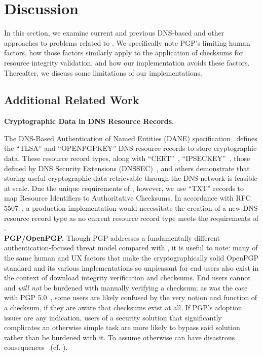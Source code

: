 \section{Discussion} \label{sec:discussion}

In this section, we examine current and previous DNS-based and other approaches
to problems related to \SYSTEM{}. We specifically note PGP's limiting human
factors, how those factors similarly apply to the application of checksums for
resource integrity validation, and how our \DNSSYS{} implementation avoids these
factors. Thereafter, we discuss some limitations of our implementations.

\subsection{Additional Related Work}

\noindent\textbf{Cryptographic Data in DNS Resource Records.}

The DNS-Based Authentication of Named Entities (DANE) specification~\cite{DANE1,
DANE2, DANE3} defines the ``TLSA'' and ``OPENPGPKEY'' DNS resource records to
store cryptographic data. These resource record types, along with
``CERT''~\cite{CERT}, ``IPSECKEY''~\cite{IPSECKEY}, those defined by DNS
Security Extensions (DNSSEC)~\cite{DNSSEC}, and others demonstrate that storing
useful cryptographic data retrievable through the DNS network is feasible at
scale. Due the unique requirements of \DNSSYS{}, however, we use ``TXT'' records
to map Resource Identifiers to Authoritative Checksums. In accordance with RFC
5507~\cite{RFC5507}, a production \DNSSYS{} implementation would necessitate the
creation of a new DNS resource record type as no current resource record type
meets the requirements of \DNSSYS{}. \\

\noindent\textbf{PGP/OpenPGP.} Though PGP addresses a fundamentally different
authentication-focused threat model compared with \SYSTEM{}, it is useful to
note: many of the same human and UX factors that make the cryptographically
solid OpenPGP standard and its various implementations so unpleasant for end
users also exist in the context of download integrity verification and
checksums. End users cannot and \textit{will not} be burdened with manually
verifying a checksum; as was the case with PGP 5.0~\cite{PGPBad}, some users are
likely confused by the very notion and function of a checksum, if they are aware
that checksums exist at all. If PGP's adoption issues are any indication, users
of a security solution that significantly complicates an otherwise simple task
are more likely to bypass said solution rather than be burdened with it. To
assume otherwise can have disastrous consequences~\cite{PGPBad} (cf.
). \\

